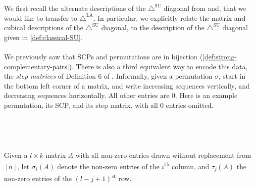 \documentclass{amsart}
\theoremstyle{definition}
\newcommand{\ordinal}{\textsuperscript{th}} %
\newcommand{\ordinalst}{\textsuperscript{st}} %
\newcommand{\SUD}{\triangle^{\mathrm{SU}}}
\newcommand{\LAD}{\triangle^{\mathrm{LA}}}
\begin{document}
We first recall the alternate descriptions of the $\SUD$ diagonal from \cite{SaneblidzeUmble04} and\cite{saneblidzeComparingDiagonalsAssociahedra2022}, that we would like to transfer to $\LAD$. 
In particular, we explicitly relate the matrix and cubical descriptions of the $\SUD$ diagonal, to the description of the $\SUD$ diagonal given in \cref{def:classical-SU}.
\\\\
We previously saw that SCPs and permutations are in bijection (\cref{def:strong-complementary-pairs}). 
There is also a third equivalent way to encode this data, the \emph{step matrices} of Definition 6 of \cite{SaneblidzeUmble04}.
Informally, given a permutation $\sigma$, start in the bottom left corner of a matrix, and write increasing sequences vertically, and decreasing sequences horizontally. All other entries are $0$. Here is an example permutation, its SCP, and its step matrix, with all $0$ entries omitted.
{\small
\begin{center}
$\quad \quad$
$\quad \quad$
\end{center}
}
Given a $l\times k$ matrix $A$ with all non-zero entries drawn without replacement from $[n]$, let $\sigma_i(A)$ denote the non-zero entries of the $i$\ordinal{} column, and $\tau_j(A)$ the non-zero entries of the $(l-j+1)$\ordinalst{} row. 
\end{document}
